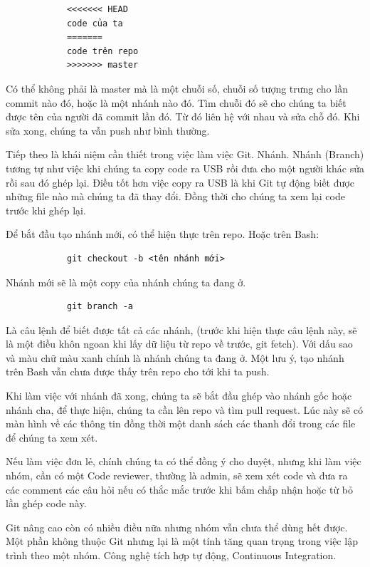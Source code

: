 \documentclass[12pt,a4paper]{report}
\begin{document}
            \begin{verbatim}
            <<<<<<< HEAD
            code của ta
            =======
            code trên repo
            >>>>>>> master
            \end{verbatim}
            Có thể không phải là master mà là một chuỗi số, chuỗi số tượng trưng cho lần commit nào đó, hoặc là một nhánh nào đó. Tìm chuỗi đó sẽ cho chúng ta biết được tên của người đã commit lần đó. Từ đó liên hệ với nhau và sửa chỗ đó. Khi sửa xong, chúng ta vẫn push như bình thường.\par

            Tiếp theo là khái niệm cần thiết trong việc làm việc Git. Nhánh. Nhánh (Branch) tương tự như việc khi chúng ta copy code ra USB rồi đưa cho một người khác sửa rồi sau đó ghép lại. Điều tốt hơn việc copy ra USB là khi Git tự động biết được những file nào mà chúng ta đã thay đổi. Đồng thời cho chúng ta xem lại code trước khi ghép lại.\par
            Để bắt đầu tạo nhánh mới, có thể hiện thực trên repo. Hoặc trên Bash:
            \begin{verbatim}
            git checkout -b <tên nhánh mới>
            \end{verbatim}
            Nhánh mới sẽ là một copy của nhánh chúng ta đang ở.
            \begin{verbatim}
            git branch -a
            \end{verbatim}
            Là câu lệnh để biết được tất cả các nhánh, (trước khi hiện thực câu lệnh này, sẽ là một điều khôn ngoan khi lấy dữ liệu từ repo về trước, git fetch). Với dấu sao và màu chữ màu xanh chính là nhánh chúng ta đang ở. Một lưu ý, tạo nhánh trên Bash vẫn chưa được thấy trên repo cho tới khi ta push.\par
            Khi làm việc với nhánh đã xong, chúng ta sẽ bắt đầu ghép vào nhánh gốc hoặc nhánh cha, để thực hiện, chúng ta cần lên repo và tìm pull request. Lúc này sẽ có màn hình về các thông tin đồng thời một danh sách các thanh đổi trong các file để chúng ta xem xét.\par
            Nếu làm việc đơn lẻ, chính chúng ta có thể đồng ý cho duyệt, nhưng khi làm việc nhóm, cần có một Code reviewer, thường là admin, sẽ xem xét code và đưa ra các comment các câu hỏi nếu có thắc mắc trước khi bấm chấp nhận hoặc từ bỏ lần ghép code này.\par
            Git nâng cao còn có nhiều điều nữa nhưng nhóm vẫn chưa thể dùng hết được. Một phần không thuộc Git nhưng lại là một tính tăng quan trọng trong việc lập trình theo một nhóm. Công nghệ tích hợp tự động, Continuous Integration.
\end{document}
